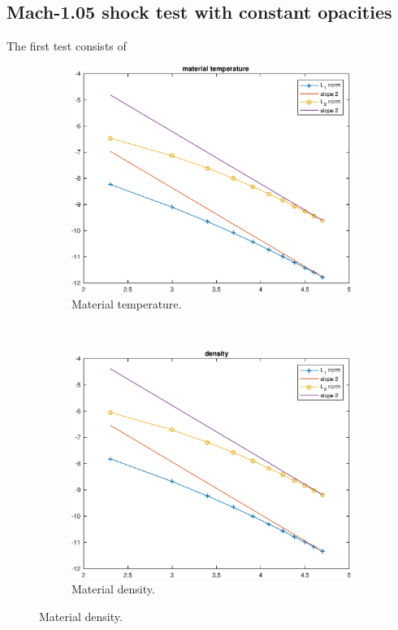 \documentclass[times,doublespace]{fldauth}%
\begin{document}
\subsection{Mach-1.05 shock test with constant opacities}\label{sec:mach-1p05-cst-xs}
%
The first test consists of  \\
%
\begin{figure}[H]
    \begin{subfigure}{0.5\textwidth}
    \centering
    \includegraphics[width=\linewidth]{figures/cst-xs/mach_1p05_material_temperature_spline.eps}
    \caption{Material temperature.}\label{fig:mach-1p05-cst-xs-temp}
    \end{subfigure}
    ~
    \begin{subfigure}{0.5\textwidth}
    \centering
    \includegraphics[width=\linewidth]{figures/cst-xs/mach_1p05_density_spline.eps}
    \caption{Material density.}\label{fig:mach-1p05-cst-xs-density}
    \end{subfigure}    
    

\end{figure}
\end{document}
